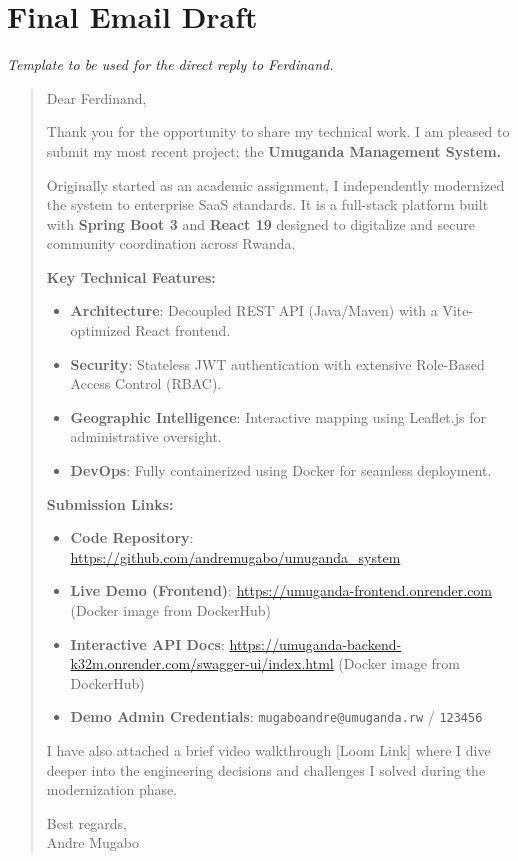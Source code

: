 \documentclass[11pt,a4paper]{article}
\begin{document}
\section{Final Email Draft}
\textit{Template to be used for the direct reply to Ferdinand.}

\begin{quote}
Dear Ferdinand,

Thank you for the opportunity to share my technical work. I am pleased to submit my most recent project: the \textbf{Umuganda Management System.} 

Originally started as an academic assignment, I independently modernized the system to enterprise SaaS standards. It is a full-stack platform built with \textbf{Spring Boot 3} and \textbf{React 19} designed to digitalize and secure community coordination across Rwanda.

\textbf{Key Technical Features:}
\begin{itemize}
    \item \textbf{Architecture}: Decoupled REST API (Java/Maven) with a Vite-optimized React frontend.
    \item \textbf{Security}: Stateless JWT authentication with extensive Role-Based Access Control (RBAC).
    \item \textbf{Geographic Intelligence}: Interactive mapping using Leaflet.js for administrative oversight.
    \item \textbf{DevOps}: Fully containerized using Docker for seamless deployment.
\end{itemize}

\textbf{Submission Links:}
\begin{itemize}
    \item \textbf{Code Repository}: \url{https://github.com/andremugabo/umuganda_system}
    \item \textbf{Live Demo (Frontend)}: \url{https://umuganda-frontend.onrender.com} (Docker image from DockerHub)
    \item \textbf{Interactive API Docs}: \url{https://umuganda-backend-k32m.onrender.com/swagger-ui/index.html} (Docker image from DockerHub)
    \item \textbf{Demo Admin Credentials}: \texttt{mugaboandre@umuganda.rw} / \texttt{123456}
\end{itemize}

I have also attached a brief video walkthrough [Loom Link] where I dive deeper into the engineering decisions and challenges I solved during the modernization phase.

Best regards, \\
Andre Mugabo
\end{quote}
\end{document}
